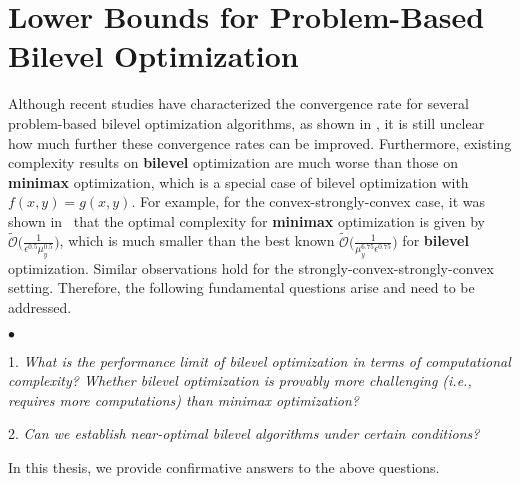 \documentclass{osudissert96}
\begin{document}
\section{Lower Bounds for Problem-Based Bilevel Optimization}
Although recent studies have characterized the convergence rate for several problem-based bilevel optimization algorithms, as shown in , it is still unclear how much further these convergence rates can be improved. Furthermore, existing complexity results on  {\bf bilevel} optimization are much worse than those on {\bf minimax} optimization, which is a special case of bilevel optimization with $f(x,y)=g(x,y)$. For example, for the convex-strongly-convex case, it was shown in~\cite{lin2020near}  that the optimal complexity for {\bf minimax} optimization is given by $\mathcal{\widetilde O}\big(\frac{1}{\epsilon^{0.5}\mu_y^{0.5}}\big)$, which is much smaller than the best known $\mathcal{ \widetilde O}\big(\frac{1}{\mu_y^{6.75}\epsilon^{0.75} }\big)$ for {\bf bilevel} optimization. Similar observations hold for the strongly-convex-strongly-convex setting. Therefore, the following fundamental questions arise and need to be addressed.
\begin{list}{$\bullet$}{\topsep=0.1in \leftmargin=0.2in \rightmargin=0.1in \itemsep =0.01in}
 \item[1.] \textit{What is the performance limit of bilevel optimization in terms of computational complexity? Whether bilevel optimization is provably more challenging (i.e., requires more computations) than minimax optimization?}
\item[2.] \textit{Can we establish near-optimal bilevel algorithms under certain conditions? }
 \end{list}
In this thesis, we provide confirmative answers to the above questions. 
\end{document}
